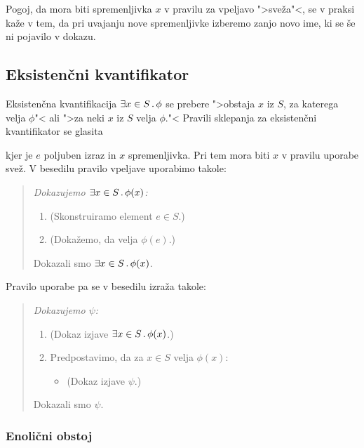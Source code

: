 Pogoj, da mora biti spremenljivka $x$ v pravilu za vpeljavo ">sveža"<,
se v praksi kaže v tem, da pri uvajanju nove spremenljivke izberemo
zanjo novo ime, ki se še ni pojavilo v dokazu.


\subsection{Eksistenčni kvantifikator}
\label{sec:eksistencni-kvantifikator}

Eksistenčna kvantifikacija $\exists x \in S \,.\, \phi$ se prebere ">obstaja
$x$ iz $S$, za katerega velja $\phi$"< ali ">za neki $x$ iz $S$ velja
$\phi$."< Pravili sklepanja za eksistenčni kvantifikator se glasita
%
%
kjer je $e$ poljuben izraz in $x$ spremenljivka. Pri tem mora biti $x$
v pravilu uporabe svež. V besedilu pravilo vpeljave uporabimo takole:
%
\begin{quote}
  \it
  Dokazujemo $\exists x \in S \,.\, \phi(x)$:
  \begin{enumerate}
  \item (Skonstruiramo element $e \in S$.)
  \item (Dokažemo, da velja $\phi(e)$.)
  \end{enumerate}
  Dokazali smo $\exists x \in S \,.\, \phi(x)$.
\end{quote}
%
Pravilo uporabe pa se v besedilu izraža takole:
%
\begin{quote}
  \it
  Dokazujemo $\psi$:
  \begin{enumerate}
  \item (Dokaz izjave $\exists x \in S \,.\, \phi(x)$.)
  \item Predpostavimo, da za $x \in S$ velja $\phi(x)$:
    \begin{itemize}
    \item[] (Dokaz izjave $\psi$.)
    \end{itemize}
  \end{enumerate}
  Dokazali smo $\psi$.
\end{quote}

\subsubsection{Enolični obstoj}
\label{sec:enolicni-obstoj}

